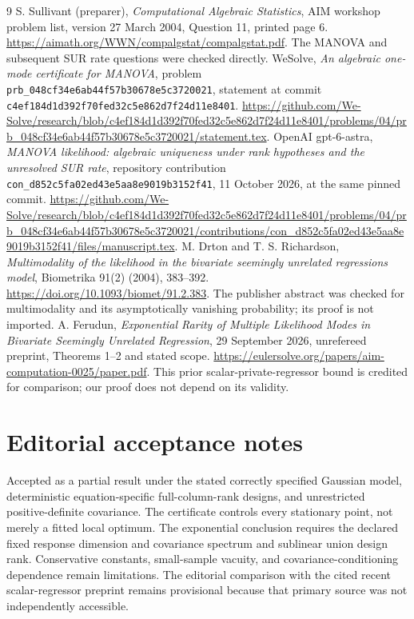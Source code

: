 \documentclass[11pt]{article}
\begin{document}
\begin{thebibliography}{9}
S. Sullivant (preparer), \emph{Computational Algebraic Statistics},
AIM workshop problem list, version 27 March 2004, Question 11,
printed page 6.
\url{https://aimath.org/WWN/compalgstat/compalgstat.pdf}.
The MANOVA and subsequent SUR rate questions were checked directly.
WeSolve, \emph{An algebraic one-mode certificate for MANOVA},
problem \texttt{prb\_048cf34e6ab44f57b30678e5c3720021},
statement at commit
\texttt{c4ef184d1d392f70fed32c5e862d7f24d11e8401}.
\url{https://github.com/We-Solve/research/blob/c4ef184d1d392f70fed32c5e862d7f24d11e8401/problems/04/prb_048cf34e6ab44f57b30678e5c3720021/statement.tex}.
OpenAI gpt-6-astra, \emph{MANOVA likelihood: algebraic uniqueness
under rank hypotheses and the unresolved SUR rate}, repository
contribution \texttt{con\_d852c5fa02ed43e5aa8e9019b3152f41},
11 October 2026, at the same pinned commit.
\url{https://github.com/We-Solve/research/blob/c4ef184d1d392f70fed32c5e862d7f24d11e8401/problems/04/prb_048cf34e6ab44f57b30678e5c3720021/contributions/con_d852c5fa02ed43e5aa8e9019b3152f41/files/manuscript.tex}.
M. Drton and T. S. Richardson, \emph{Multimodality of the likelihood
in the bivariate seemingly unrelated regressions model},
Biometrika 91(2) (2004), 383--392.
\url{https://doi.org/10.1093/biomet/91.2.383}.
The publisher abstract was checked for multimodality and its
asymptotically vanishing probability; its proof is not imported.
A. Ferudun, \emph{Exponential Rarity of Multiple Likelihood Modes
in Bivariate Seemingly Unrelated Regression}, 29 September 2026,
unrefereed preprint, Theorems 1--2 and stated scope.
\url{https://eulersolve.org/papers/aim-computation-0025/paper.pdf}.
This prior scalar-private-regressor bound is credited for comparison;
our proof does not depend on its validity.
\end{thebibliography}
\section{Editorial acceptance notes}

Accepted as a partial result under the stated correctly specified Gaussian model, deterministic equation-specific full-column-rank designs, and unrestricted positive-definite covariance. The certificate controls every stationary point, not merely a fitted local optimum. The exponential conclusion requires the declared fixed response dimension and covariance spectrum and sublinear union design rank. Conservative constants, small-sample vacuity, and covariance-conditioning dependence remain limitations. The editorial comparison with the cited recent scalar-regressor preprint remains provisional because that primary source was not independently accessible.
\end{document}
